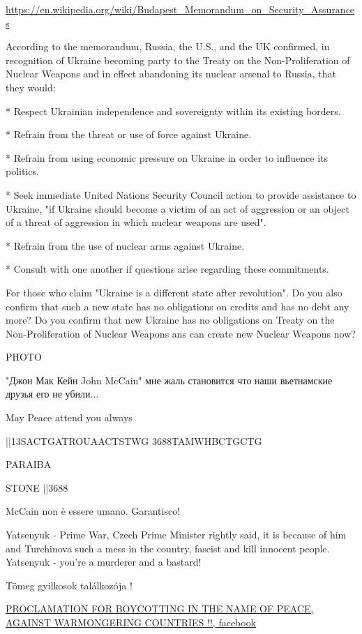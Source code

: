 \url{https://en.wikipedia.org/wiki/Budapest_Memorandum_on_Security_Assurances}

According to the memorandum, Russia, the U.S., and the UK confirmed, in
recognition of Ukraine becoming party to the Treaty on the Non-Proliferation of
Nuclear Weapons and in effect abandoning its nuclear arsenal to Russia, that
they would:

* Respect Ukrainian independence and sovereignty within its existing borders.

* Refrain from the threat or use of force against Ukraine.

* Refrain from using economic pressure on Ukraine in order to influence its politics.

* Seek immediate United Nations Security Council action to provide assistance to Ukraine, "if Ukraine should become a victim of an act of aggression or an object of a threat of aggression in which nuclear weapons are used".

* Refrain from the use of nuclear arms against Ukraine.

* Consult with one another if questions arise regarding these commitments.

For those who claim "Ukraine is a different state after revolution". Do you
also confirm that such a new state has no obligations on credits and has no
debt any more? Do you confirm that new Ukraine has no obligations on Treaty on
the Non-Proliferation of Nuclear Weapons ans can create new Nuclear Weapons
now?

PHOTO

"Джон Мак Кейн John McCain" мне жаль становится что наши вьетнамские друзья его не убили...


May Peace attend you always

||13SACTGATROUAACTSTWG 3688TAMWHBCTGCTG

PARAIBA

STONE ||3688

McCain non è essere umano. Garantisco!


Yatsenyuk - Prime War, Czech Prime Minister rightly said, it is because of him
and Turchinova such a mess in the country, fascist and kill innocent people.
Yatsenyuk - you're a murderer and a bastard!


Tömeg gyilkosok találkozója !

\href{https://www.facebook.com/notes/349016649860342}{
PROCLAMATION FOR BOYCOTTING IN THE NAME OF PEACE, AGAINST WARMONGERING COUNTRIES !!, facebook%
}

